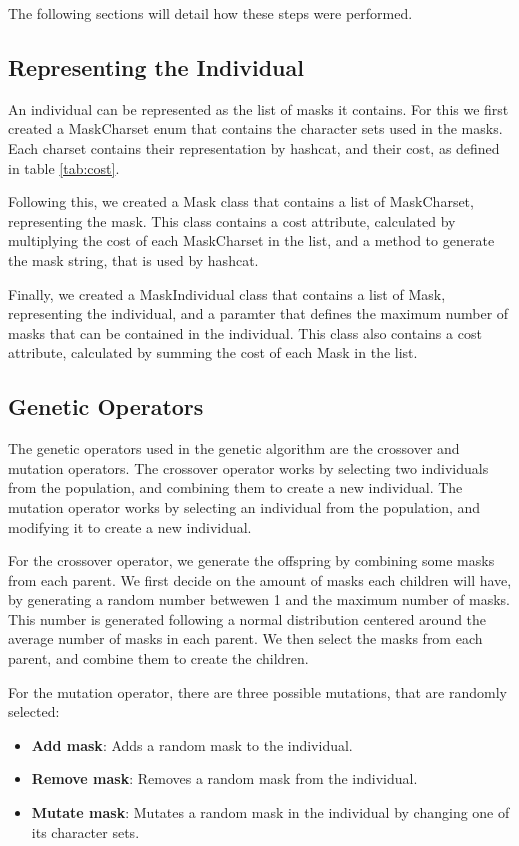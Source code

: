 \documentclass[sigconf,authordraft]{acmart}
\begin{document}
The following sections will detail how these steps were performed.

\subsection{Representing the Individual}

An individual can be represented as the list of masks it contains.
For this we first created a MaskCharset enum that contains the character sets used in the masks.
Each charset contains their representation by hashcat, and their cost, as defined in table \ref{tab:cost}.

Following this, we created a Mask class that contains a list of MaskCharset, representing the mask.
This class contains a cost attribute, calculated by multiplying the cost of each MaskCharset in the list, and a method to generate the mask string, that is used by hashcat.

Finally, we created a MaskIndividual class that contains a list of Mask, representing the individual, and a paramter that defines the maximum number of masks that can be contained in the individual.
This class also contains a cost attribute, calculated by summing the cost of each Mask in the list.

\subsection{Genetic Operators}

The genetic operators used in the genetic algorithm are the crossover and mutation operators.
The crossover operator works by selecting two individuals from the population, and combining them to create a new individual.
The mutation operator works by selecting an individual from the population, and modifying it to create a new individual.

For the crossover operator, we generate the offspring by combining some masks from each parent.
We first decide on the amount of masks each children will have, by generating a random number betwewen 1 and the maximum number of masks.
This number is generated following a normal distribution centered around the average number of masks in each parent.
We then select the masks from each parent, and combine them to create the children.

For the mutation operator, there are three possible mutations, that are randomly selected:

\begin{itemize}
  \item \textbf{Add mask}: Adds a random mask to the individual.
  \item \textbf{Remove mask}: Removes a random mask from the individual.
  \item \textbf{Mutate mask}: Mutates a random mask in the individual by changing one of its character sets.
\end{itemize}
\end{document}
